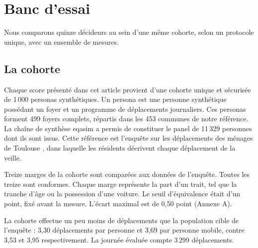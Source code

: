 
\section{Banc d'essai}
\label{sec:bench}

Nous comparons quinze décideurs au sein d'une même cohorte, selon un protocole unique, avec un ensemble de mesures.

\subsection{La cohorte}
\label{sec:cohort}

Chaque score présenté dans cet article provient d'une cohorte unique et sécurisée de 1\,000 personas synthétiques. Un persona est une personne synthétique possédant un foyer et un programme de déplacements journaliers. Ces personas forment 499 foyers complets, répartis dans les 453 communes de notre référence. La chaîne de synthèse eqasim \citep{horl2021eqasim} a permis de constituer le panel de 11\,329 personnes dont ils sont issus. Cette référence est l'enquête sur les déplacements des ménages de Toulouse \citep{tisseo2023emc2}, dans laquelle les résidents décrivent chaque déplacement de la veille.

Treize marges de la cohorte sont comparées aux données de l'enquête. Toutes les treize sont conformes. Chaque marge représente la part d'un trait, tel que la tranche d'âge ou la possession d'une voiture. Le seuil d'équivalence était d'un point, fixé avant la mesure. L'écart maximal est de 0,50 point (Annexe A).

La cohorte effectue un peu moins de déplacements que la population cible de l'enquête : 3,30 déplacements par personne et 3,69 par personne mobile, contre 3,53 et 3,95 respectivement. La journée évaluée compte 3\,299 déplacements.

